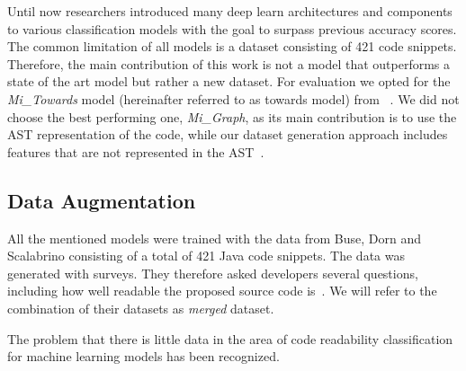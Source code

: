 \documentclass[%
class=scrreprt,
chapterprefix=false,%
open=right,%
twoside=false,%
paper=a4,%
logofile={Logo\_zentral\_farbig\_EN.png},%
thesistype=master,%
UKenglish,%
]{se2thesis}
\theoremstyle{definition}
\newcommand{\numMerged}{421\xspace}
\begin{document}

	
	Until now researchers introduced many deep learn architectures and components to various classification models with the goal to surpass previous accuracy scores. The common limitation of all models is a dataset consisting of \numMerged code snippets. %
	Therefore, the main contribution of this work is not a model that outperforms a state of the art model but rather a new dataset. For evaluation we opted for the \textit{Mi\_Towards} model (hereinafter referred to as towards model) from \citeauthor{mi2022towards}~\cite{mi2022towards}. We did not choose the best performing one, \textit{Mi\_Graph}, as its main contribution is to use the AST representation of the code, while our dataset generation approach includes features that are not represented in the AST~\cite{mi2023graph}.
			
\subsection{Data Augmentation} \label{Data Augmentation}

	All the mentioned models were trained with the data from Buse, Dorn and Scalabrino consisting of a total of \numMerged Java code snippets. The data was generated with surveys. They therefore asked developers several questions, including how well readable the proposed source code is~\cite{buse2009learning, dorn2012general, scalabrino2018comprehensive}. We will refer to the combination of their datasets as \textit{merged} dataset.
	
	The problem that there is little data in the area of code readability classification for machine learning models has been recognized.
					
\end{document}
